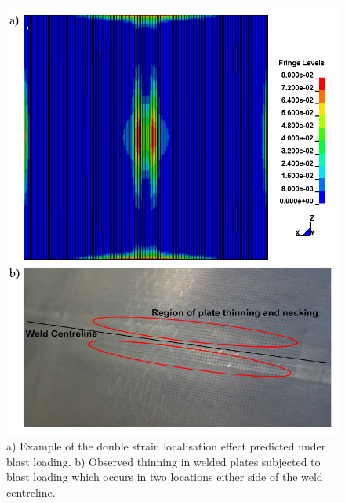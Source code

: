 \begin{figure}[h!]
	\centering
	\includegraphics[width=1\linewidth]{DoubleStrainPredict3}
	\caption[Mesh]{a) Example of the double strain localisation effect predicted under blast loading. b) Observed thinning in welded plates subjected to blast loading which occurs in two locations either side of the weld centreline.}
	\label{fig:BlastStrainReality}
\end{figure} 
%


